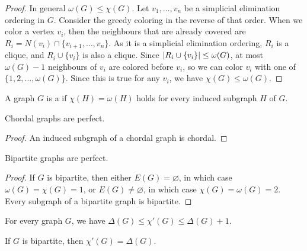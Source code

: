 \begin{proof}
  In general $\omega(G) \le \chi(G)$.
  Let $v_1, \ldots, v_n$ be a simplicial elimination ordering in $G$.
  Consider the greedy coloring in the reverse of that order.
  When we color a vertex $v_i$, then the neighbours that are already covered are
  $R_i = N(v_i) \cap \{ v_{i+1}, \ldots, v_n \}$.
  As it is a simplicial elimination ordering, $R_i$ is a clique, and $R_i \cup
  \{v_i\}$ is also a clique.
  Since $\left| R_i \cup \{v_i\} \right| \le \omega(G)$, at most $\omega(G) - 1$
  neighbours of $v_i$ are colored before $v_i$, so we can color $v_i$ with one
  of $\{1, 2, \ldots, \omega(G)\}$.
  Since this is true for any $v_i$, we have $\chi(G) \le \omega(G)$.
\end{proof}


\begin{definition}
  A graph $G$ is a  if $\chi(H) = \omega(H)$ holds for
  every induced subgraph $H$ of $G$.
\end{definition}

\begin{theorem}
  Chordal graphs are perfect.
\end{theorem}

\begin{proof}
  An induced subgraph of a chordal graph is chordal.
\end{proof}

\begin{theorem}
  Bipartite graphs are perfect.
\end{theorem}

\begin{proof}
  If $G$ is bipartite, then either $E(G) = \varnothing$, in which case
  $\omega(G) = \chi(G) = 1$, or $E(G) \ne \varnothing$, in which case $\chi(G) =
  \omega(G) = 2$.
  Every subgraph of a bipartite graph is bipartite.
\end{proof}

\begin{theorem}[Vizing]
  For every graph $G$, we have $\Delta(G) \le \chi'(G) \le \Delta(G)+1$.
\end{theorem}

\begin{theorem}
  If $G$ is bipartite, then $\chi'(G) = \Delta(G)$.
\end{theorem}

